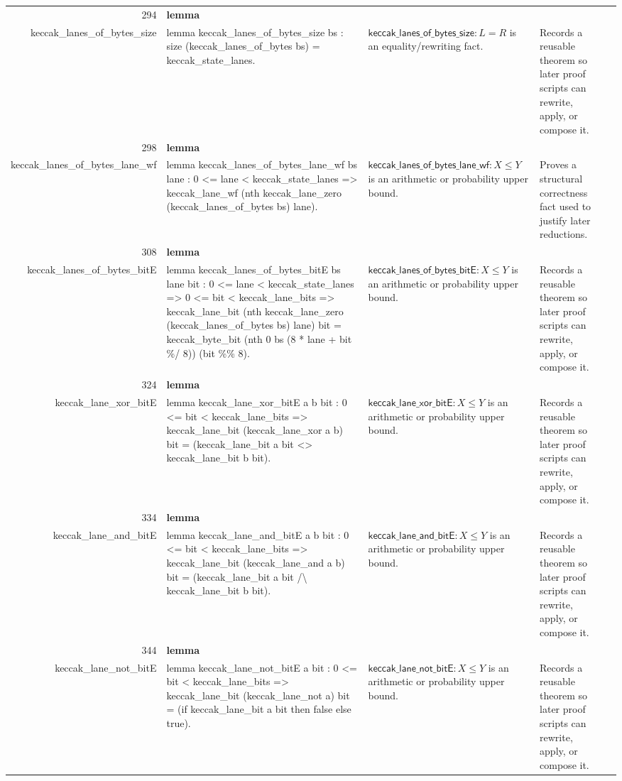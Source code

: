 \documentclass[10pt]{article}
\newcommand{\ec}[1]{\begingroup\ttfamily\scriptsize #1\endgroup}
\begin{document}
\begin{longtable}{r L{0.17\textwidth} L{0.26\textwidth} L{0.27\textwidth} L{0.20\textwidth}}
294 & \textbf{lemma}\\\ec{keccak\_lanes\_of\_bytes\_size} & \ec{lemma keccak\_lanes\_of\_bytes\_size bs : size (keccak\_lanes\_of\_bytes bs) = keccak\_state\_lanes.} & \(\mathsf{keccak\_lanes\_of\_bytes\_size} : L = R\) is an equality/rewriting fact. & Records a reusable theorem so later proof scripts can rewrite, apply, or compose it. \\
298 & \textbf{lemma}\\\ec{keccak\_lanes\_of\_bytes\_lane\_wf} & \ec{lemma keccak\_lanes\_of\_bytes\_lane\_wf bs lane : 0 <= lane < keccak\_state\_lanes => keccak\_lane\_wf (nth keccak\_lane\_zero (keccak\_lanes\_of\_bytes bs) lane).} & \(\mathsf{keccak\_lanes\_of\_bytes\_lane\_wf} : X \le Y\) is an arithmetic or probability upper bound. & Proves a structural correctness fact used to justify later reductions. \\
308 & \textbf{lemma}\\\ec{keccak\_lanes\_of\_bytes\_bitE} & \ec{lemma keccak\_lanes\_of\_bytes\_bitE bs lane bit : 0 <= lane < keccak\_state\_lanes => 0 <= bit < keccak\_lane\_bits => keccak\_lane\_bit (nth keccak\_lane\_zero (keccak\_lanes\_of\_bytes bs) lane) bit = keccak\_byte\_bit (nth 0 bs (8 * lane + bit \%/ 8)) (bit \%\% 8).} & \(\mathsf{keccak\_lanes\_of\_bytes\_bitE} : X \le Y\) is an arithmetic or probability upper bound. & Records a reusable theorem so later proof scripts can rewrite, apply, or compose it. \\
324 & \textbf{lemma}\\\ec{keccak\_lane\_xor\_bitE} & \ec{lemma keccak\_lane\_xor\_bitE a b bit : 0 <= bit < keccak\_lane\_bits => keccak\_lane\_bit (keccak\_lane\_xor a b) bit = (keccak\_lane\_bit a bit <> keccak\_lane\_bit b bit).} & \(\mathsf{keccak\_lane\_xor\_bitE} : X \le Y\) is an arithmetic or probability upper bound. & Records a reusable theorem so later proof scripts can rewrite, apply, or compose it. \\
334 & \textbf{lemma}\\\ec{keccak\_lane\_and\_bitE} & \ec{lemma keccak\_lane\_and\_bitE a b bit : 0 <= bit < keccak\_lane\_bits => keccak\_lane\_bit (keccak\_lane\_and a b) bit = (keccak\_lane\_bit a bit /\textbackslash{} keccak\_lane\_bit b bit).} & \(\mathsf{keccak\_lane\_and\_bitE} : X \le Y\) is an arithmetic or probability upper bound. & Records a reusable theorem so later proof scripts can rewrite, apply, or compose it. \\
344 & \textbf{lemma}\\\ec{keccak\_lane\_not\_bitE} & \ec{lemma keccak\_lane\_not\_bitE a bit : 0 <= bit < keccak\_lane\_bits => keccak\_lane\_bit (keccak\_lane\_not a) bit = (if keccak\_lane\_bit a bit then false else true).} & \(\mathsf{keccak\_lane\_not\_bitE} : X \le Y\) is an arithmetic or probability upper bound. & Records a reusable theorem so later proof scripts can rewrite, apply, or compose it. \\

\end{longtable}
\end{document}
